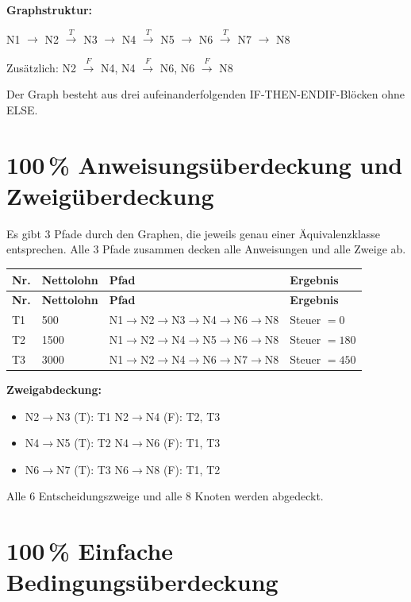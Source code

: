 \documentclass[
	fontsize=12pt,          %
	paper=a4,               %
	numbers=noenddot,       %
	listof=totoc,           %
	listof=entryprefix,     %
	listof=nochaptergap,    %
	bibliography=totoc,     %
	parskip=half,           %
	openany                 %
]{scrbook}
\begin{document}
\textbf{Graphstruktur:}

N1 $\rightarrow$ N2 $\xrightarrow{T}$ N3 $\rightarrow$ N4 $\xrightarrow{T}$ N5 $\rightarrow$ N6 $\xrightarrow{T}$ N7 $\rightarrow$ N8

Zusätzlich: N2 $\xrightarrow{F}$ N4, \quad N4 $\xrightarrow{F}$ N6, \quad N6 $\xrightarrow{F}$ N8

Der Graph besteht aus drei aufeinanderfolgenden IF-THEN-ENDIF-Blöcken ohne ELSE.

\section*{100\,\% Anweisungsüberdeckung und Zweigüberdeckung}

Es gibt 3 Pfade durch den Graphen, die jeweils genau einer Äquivalenzklasse entsprechen.
Alle 3 Pfade zusammen decken alle Anweisungen und alle Zweige ab.

\begin{longtable}{| p{0.5cm} | p{2.0cm} | p{5.5cm} | p{3.5cm} |}
	\hline
	\textbf{Nr.} & \textbf{Nettolohn} & \textbf{Pfad} & \textbf{Ergebnis} \\ \hline
	\endfirsthead
	\hline
	\textbf{Nr.} & \textbf{Nettolohn} & \textbf{Pfad} & \textbf{Ergebnis} \\ \hline
	\endhead
	\hline
	\endfoot
	T1 & 500 & N1$\to$N2$\to$N3$\to$N4$\to$N6$\to$N8 & Steuer $= 0$ \\ \hline
	T2 & 1500 & N1$\to$N2$\to$N4$\to$N5$\to$N6$\to$N8 & Steuer $= 180$ \\ \hline
	T3 & 3000 & N1$\to$N2$\to$N4$\to$N6$\to$N7$\to$N8 & Steuer $= 450$ \\ \hline
\end{longtable}

\textbf{Zweigabdeckung:}
\begin{itemize}
	\item N2$\to$N3 (T): T1 \quad N2$\to$N4 (F): T2, T3
	\item N4$\to$N5 (T): T2 \quad N4$\to$N6 (F): T1, T3
	\item N6$\to$N7 (T): T3 \quad N6$\to$N8 (F): T1, T2
\end{itemize}

Alle 6 Entscheidungszweige und alle 8 Knoten werden abgedeckt.

\section*{100\,\% Einfache Bedingungsüberdeckung}
\end{document}
